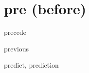 \chapter{pre (before)}

\begin{word}{precede}
\end{word}

\begin{word}{previous}
\end{word}

\begin{word}{predict, prediction}
\end{word}